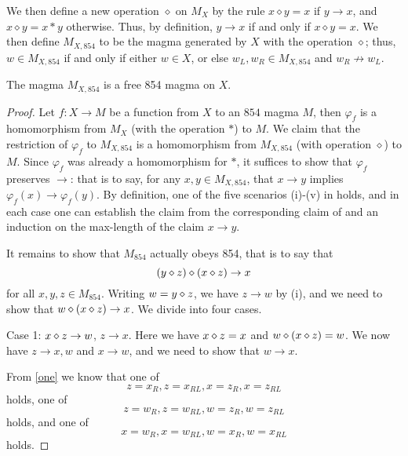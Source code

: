 We then define a new operation $\diamond$ on $M_X$ by the rule $x \diamond y = x$ if $y \to x$, and $x \diamond y = x*y$ otherwise. Thus, by definition, $y \to x$ if and only if $x \diamond y = x$.  We then define $M_{X,854}$ to be the magma generated by $X$ with the operation $\diamond$; thus, $w \in M_{X,854}$ if and only if either $w \in X$, or else $w_L, w_R \in M_{X,854}$ and $w_R \not \to w_L$.

\begin{theorem}\label{free-854}  The magma $M_{X,854}$ is a free 854 magma on $X$.
\end{theorem}

\begin{proof}  Let  $f: X \to M$ be a function from $X$ to an $854$ magma $M$, then $\varphi_f$ is a homomorphism from $M_X$ (with the operation $*$) to $M$.  We claim that the restriction of $\varphi_f$ to $M_{X,854}$ is a homomorphism from $M_{X,854}$ (with operation $\diamond$) to $M$.  Since $\varphi_f$ was already a homomorphism for $*$, it suffices to show that $\varphi_f$ preserves $\to$: that is to say, for any $x,y \in M_{X,854}$, that $x \to y$ implies $\varphi_f(x) \to \varphi_f(y)$.  By definition, one of the five scenarios (i)-(v) in  holds, and in each case one can establish the claim from the corresponding claim of  and an induction on the max-length of the claim $x \to y$.

It remains to show that $M_{854}$ actually obeys 854, that is to say that
$$ (y \diamond z) \diamond (x \diamond z) \to x$$
for all $x,y,z \in M_{854}$.  Writing $w = y \diamond z$, we have $z \to w$ by (i), and we need to show that $w \diamond (x \diamond z) \to x$.  We divide into four cases.

Case 1: $x \diamond z \to w$, $z \to x$.  Here we have $x \diamond z = x$ and $w \diamond (x \diamond z) = w$.  We now have $z \to x,w$ and $x \to w$, and we need to show that $w \to x$.

From \eqref{one} we know that one of
\begin{equation}\label{one-1}
  z = x_R, z = x_{RL}, x = z_R, x = z_{RL}
\end{equation}
holds, one of
\begin{equation}\label{one-2}
  z = w_R, z = w_{RL}, w = z_R, w = z_{RL}
\end{equation}
holds, and one of
\begin{equation}\label{one-3}
  x = w_R, x = w_{RL}, w = x_R, w = x_{RL}
\end{equation}
holds.


\end{proof}
